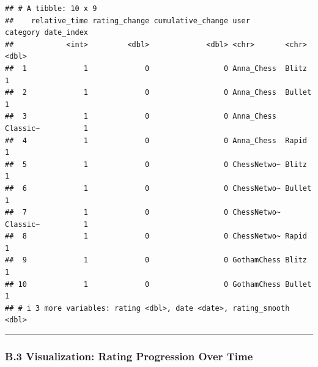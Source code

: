 \documentclass[
]{article}
\begin{document}
\begin{verbatim}
## # A tibble: 10 x 9
##    relative_time rating_change cumulative_change user        category date_index
##            <int>         <dbl>             <dbl> <chr>       <chr>         <dbl>
##  1             1             0                 0 Anna_Chess  Blitz             1
##  2             1             0                 0 Anna_Chess  Bullet            1
##  3             1             0                 0 Anna_Chess  Classic~          1
##  4             1             0                 0 Anna_Chess  Rapid             1
##  5             1             0                 0 ChessNetwo~ Blitz             1
##  6             1             0                 0 ChessNetwo~ Bullet            1
##  7             1             0                 0 ChessNetwo~ Classic~          1
##  8             1             0                 0 ChessNetwo~ Rapid             1
##  9             1             0                 0 GothamChess Blitz             1
## 10             1             0                 0 GothamChess Bullet            1
## # i 3 more variables: rating <dbl>, date <date>, rating_smooth <dbl>
\end{verbatim}

\begin{center}\rule{0.5\linewidth}{0.5pt}\end{center}

\subsubsection{B.3 Visualization: Rating Progression Over
Time}\label{b.3-visualization-rating-progression-over-time}
\end{document}
